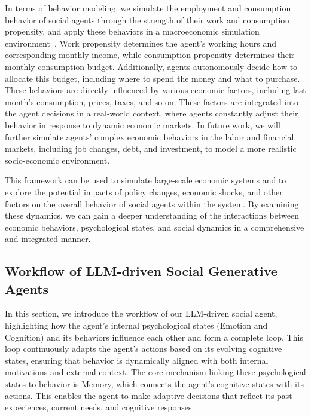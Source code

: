 In terms of behavior modeling, we simulate the employment and consumption behavior of social agents through the strength of their work and consumption propensity, and apply these behaviors in a macroeconomic simulation environment~\cite{li2024econagent}. Work propensity determines the agent’s working hours and corresponding monthly income, while consumption propensity determines their monthly consumption budget. Additionally, agents autonomously decide how to allocate this budget, including where to spend the money and what to purchase. These behaviors are directly influenced by various economic factors, including last month's consumption, prices, taxes, and so on. These factors are integrated into the agent decisions in a real-world context, where agents constantly adjust their behavior in response to dynamic economic markets. In future work, we will further simulate agents' complex economic behaviors in the labor and financial markets, including job changes, debt, and investment, to model a more realistic socio-economic environment.

This framework can be used to simulate large-scale economic systems and to explore the potential impacts of policy changes, economic shocks, and other factors on the overall behavior of social agents within the system. By examining these dynamics, we can gain a deeper understanding of the interactions between economic behaviors, psychological states, and social dynamics in a comprehensive and integrated manner.




\subsection{Workflow of LLM-driven Social Generative Agents} \label{sec:workflow}

In this section, we introduce the workflow of our LLM-driven social agent, highlighting how the agent’s internal psychological states (Emotion and Cognition) and its behaviors influence each other and form a complete loop. This loop continuously adapts the agent’s actions based on its evolving cognitive states, ensuring that behavior is dynamically aligned with both internal motivations and external context. The core mechanism linking these psychological states to behavior is Memory, which connects the agent’s cognitive states with its actions. This enables the agent to make adaptive decisions that reflect its past experiences, current needs, and cognitive responses.

